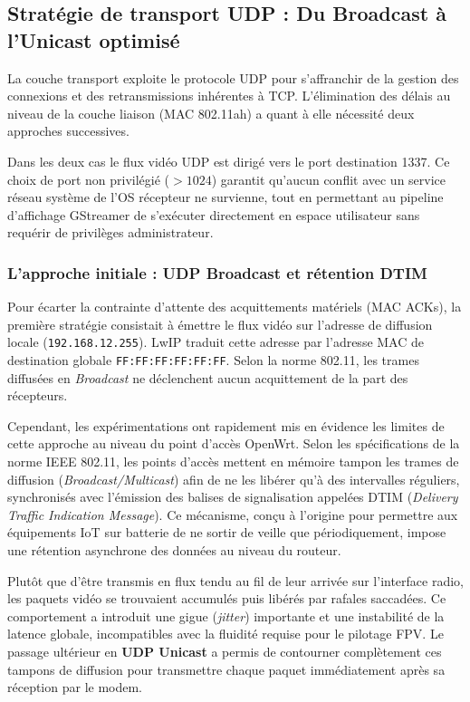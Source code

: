 \subsection{Stratégie de transport UDP : Du Broadcast à l'Unicast optimisé}
La couche transport exploite le protocole UDP pour s'affranchir de la gestion des connexions et des 
retransmissions inhérentes à TCP. L'élimination des délais au niveau de la couche liaison (MAC 802.11ah) 
a quant à elle nécessité deux approches successives.\newline \newline

Dans les deux cas le flux vidéo UDP est dirigé vers le port destination 1337. Ce choix de port non privilégié ($> 1024$) garantit 
qu'aucun conflit avec un service réseau système de l'OS récepteur ne survienne, tout en permettant au pipeline 
d'affichage GStreamer de s'exécuter directement en espace utilisateur sans requérir de privilèges administrateur. 

\subsubsection{L'approche initiale : UDP Broadcast et rétention DTIM}
Pour écarter la contrainte d'attente des acquittements matériels (MAC ACKs), la première stratégie consistait à émettre 
le flux vidéo sur l'adresse de diffusion locale (\texttt{192.168.12.255}). LwIP traduit cette adresse par 
l'adresse MAC de destination globale \texttt{FF:FF:FF:FF:FF:FF}. Selon la norme 802.11, les trames diffusées 
en \textit{Broadcast} ne déclenchent aucun acquittement de la part des récepteurs.

Cependant, les expérimentations ont rapidement mis en évidence les limites de cette approche au niveau du point d'accès OpenWrt. 
Selon les spécifications de la norme IEEE 802.11, les points d'accès mettent en mémoire tampon 
les trames de diffusion (\textit{Broadcast/Multicast}) afin de ne les libérer qu'à des intervalles réguliers, synchronisés 
avec l'émission des balises de signalisation appelées DTIM (\textit{Delivery Traffic Indication Message}). Ce mécanisme, 
conçu à l'origine pour permettre aux équipements IoT sur batterie de ne sortir de veille que périodiquement, 
impose une rétention asynchrone des données au niveau du routeur.

Plutôt que d'être transmis en flux tendu au fil de leur arrivée sur l'interface radio, les paquets vidéo se trouvaient 
accumulés puis libérés par rafales saccadées. Ce comportement a introduit une gigue (\textit{jitter}) importante et une 
instabilité de la latence globale, incompatibles avec la fluidité requise pour le pilotage FPV. Le passage ultérieur en 
\textbf{UDP Unicast} a permis de contourner complètement ces tampons de diffusion pour transmettre chaque paquet 
immédiatement après sa réception par le modem.

